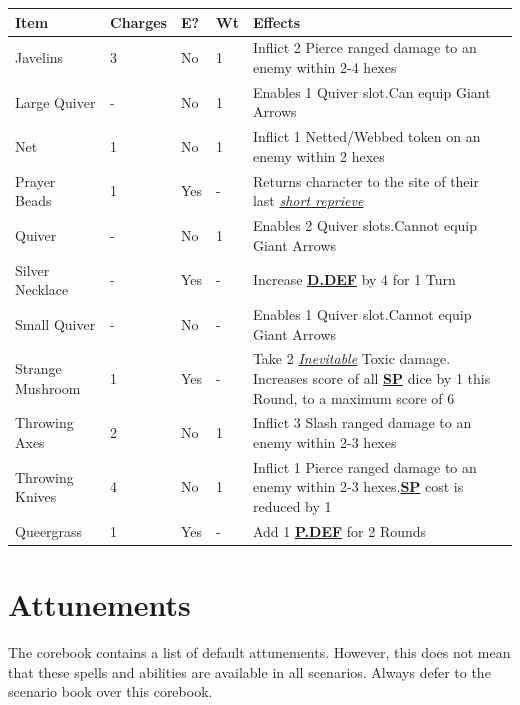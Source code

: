 \documentclass[12pt]{article}
\newcommand{\refto}[1]{\hyperlink{#1}{\textbf{#1}}}
\newcommand{\reftoit}[1]{\hyperlink{#1}{\emph{#1}}}
\begin{document}
\pagebreak

\begin{center}
\begin{tabularx}{\textwidth}{p{}p{}p{}p{}p{}}
\hline
\rowcolor{white} \textbf{Item} & \textbf{Charges} & \textbf{E?} & \textbf{Wt} & \textbf{Effects}\setcounter{rownum}{0}\\
\hline
Javelins & 3 & No & 1 & Inflict 2 Pierce ranged damage to an enemy within 2-4 hexes \\
Large Quiver & - & No & 1 & Enables 1 Quiver slot.\newline Can equip Giant Arrows \\
Net & 1 & No & 1 & Inflict 1 Netted/Webbed token on an enemy within 2 hexes \\
Prayer Beads & 1 & Yes & - & Returns character to the site of their last \reftoit{short reprieve} \\
Quiver & - & No & 1 & Enables 2 Quiver slots.\newline Cannot equip Giant Arrows \\
Silver Necklace & - & Yes & - & Increase \refto{D.DEF} by 4 for 1 Turn \\
Small Quiver & - & No & - & Enables 1 Quiver slot.\newline Cannot equip Giant Arrows \\
Strange Mushroom & 1 & Yes & - & Take 2 \reftoit{Inevitable} Toxic damage. Increases score of all \refto{SP} dice by 1 this Round, to a maximum score of 6\\
Throwing Axes & 2 & No & 1 & Inflict 3 Slash ranged damage to an enemy within 2-3 hexes \\
Throwing Knives & 4 & No & 1 & Inflict 1 Pierce ranged damage to an enemy within 2-3 hexes.\newline \refto{SP} cost is reduced by 1 \\
Queergrass & 1 & Yes & - & Add 1 \refto{P.DEF} for 2 Rounds \\
\hline
\end{tabularx}
\end{center}

\pagebreak

\section{Attunements}
The corebook contains a list of default attunements. However, this does not mean that these spells and abilities are available in all scenarios. Always defer to the scenario book over this corebook.
\end{document}
